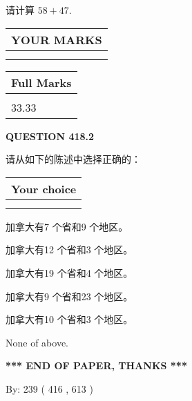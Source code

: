 \documentclass{ctexart}
\begin{document}
  
 
请计算 $ %
58 +  %
47 $.
 

 

 
  
\vspace{0.2in}
  
\noindent\begin{tabular}{|l|}
\hline
 YOUR MARKS  \\
\hline
 \\ 
 \\ 
\hline
\end{tabular}
\hspace{0.05in} \begin{tabular}{|l|}
\hline
 Full Marks  \\
\hline
 \\ 
33.33 \\
\hline
\end{tabular}
{\textbf{\Large{QUESTION
418.2 
}}}
  
  
请从如下的陈述中选择正确的：
  
  
\noindent\hspace{3.0in} \begin{tabular}{|l|}
\hline
Your choice \\
\hline
 \\ 
 \\ 
\hline
\end{tabular}
  
  
 
 
加拿大有7 个省和9 个地区。
 
 
加拿大有12 个省和3 个地区。
 
 
加拿大有19 个省和4 个地区。
 
 
加拿大有9 个省和23 个地区。
 
 
加拿大有10 个省和3 个地区。
 
 
 None of above.
 
 
   
   
 \vspace{0.2in}
 
   
   
   
   
\vspace{1.0in} 
{\textbf{\large{ *** END OF PAPER, THANKS *** }}} 
   
   
\hspace{1.0in} By: 
 239 ( 416 ,  613 )
   
\end{document}
